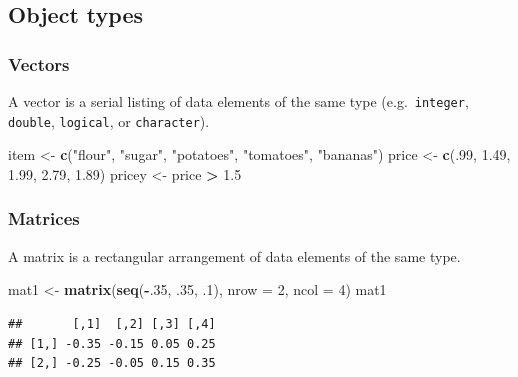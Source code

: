 \documentclass[
  11pt,
]{article}
\newenvironment{Shaded}{\begin{snugshade}}{\end{snugshade}}
\newcommand{\AttributeTok}[1]{\textcolor[rgb]{0.13,0.29,0.53}{#1}}
\newcommand{\DecValTok}[1]{\textcolor[rgb]{0.00,0.00,0.81}{#1}}
\newcommand{\FloatTok}[1]{\textcolor[rgb]{0.00,0.00,0.81}{#1}}
\newcommand{\FunctionTok}[1]{\textcolor[rgb]{0.13,0.29,0.53}{\textbf{#1}}}
\newcommand{\NormalTok}[1]{#1}
\newcommand{\OtherTok}[1]{\textcolor[rgb]{0.56,0.35,0.01}{#1}}
\newcommand{\SpecialCharTok}[1]{\textcolor[rgb]{0.81,0.36,0.00}{\textbf{#1}}}
\newcommand{\StringTok}[1]{\textcolor[rgb]{0.31,0.60,0.02}{#1}}
\begin{document}
\hypertarget{object-types}{%
\subsection{Object types}\label{object-types}}

\hypertarget{vectors}{%
\subsubsection{Vectors}\label{vectors}}

A vector is a serial listing of data elements of the same type (e.g.~\texttt{integer}, \texttt{double}, \texttt{logical}, or \texttt{character}).

\begin{Shaded}
\begin{Highlighting}[]
\NormalTok{item }\OtherTok{\textless{}{-}} \FunctionTok{c}\NormalTok{(}\StringTok{"flour"}\NormalTok{, }\StringTok{"sugar"}\NormalTok{, }\StringTok{"potatoes"}\NormalTok{, }\StringTok{"tomatoes"}\NormalTok{, }\StringTok{"bananas"}\NormalTok{)}
\NormalTok{price }\OtherTok{\textless{}{-}} \FunctionTok{c}\NormalTok{(.}\DecValTok{99}\NormalTok{, }\FloatTok{1.49}\NormalTok{, }\FloatTok{1.99}\NormalTok{, }\FloatTok{2.79}\NormalTok{, }\FloatTok{1.89}\NormalTok{)}
\NormalTok{pricey }\OtherTok{\textless{}{-}}\NormalTok{ price }\SpecialCharTok{\textgreater{}} \FloatTok{1.5}
\end{Highlighting}
\end{Shaded}

\hypertarget{matrices}{%
\subsubsection{Matrices}\label{matrices}}

A matrix is a rectangular arrangement of data elements of the same type.

\begin{Shaded}
\begin{Highlighting}[]
\NormalTok{mat1 }\OtherTok{\textless{}{-}} \FunctionTok{matrix}\NormalTok{(}\FunctionTok{seq}\NormalTok{(}\SpecialCharTok{{-}}\NormalTok{.}\DecValTok{35}\NormalTok{, .}\DecValTok{35}\NormalTok{, .}\DecValTok{1}\NormalTok{), }\AttributeTok{nrow =} \DecValTok{2}\NormalTok{, }\AttributeTok{ncol =} \DecValTok{4}\NormalTok{)}
\NormalTok{mat1}
\end{Highlighting}
\end{Shaded}

\begin{verbatim}
##       [,1]  [,2] [,3] [,4]
## [1,] -0.35 -0.15 0.05 0.25
## [2,] -0.25 -0.05 0.15 0.35
\end{verbatim}
\end{document}
